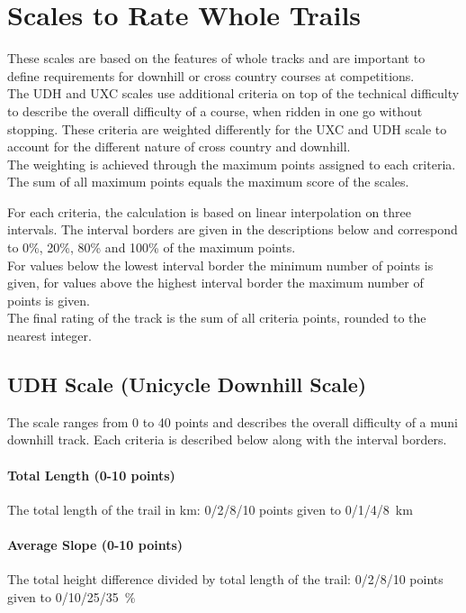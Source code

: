 \documentclass[a4paper,oneside]{scrartcl}
\begin{document}
\section{Scales to Rate Whole Trails}
\label{sec:muni-difficulty-udh-uxc}

These scales are based on the features of whole tracks and are important to
define requirements for downhill or cross country courses at competitions.\\
The UDH and UXC scales use additional criteria on top of the technical difficulty
to describe the overall difficulty of a course, when ridden in one go without stopping.
These criteria are weighted differently for the UXC and UDH scale to account for the
different nature of cross country and downhill.\\
The weighting is achieved through the maximum points assigned to each criteria. The sum
of all maximum points equals the maximum score of the scales.

For each criteria, the calculation is based on linear interpolation on three intervals.
The interval borders are given in the descriptions below and correspond to 0\%,
20\%, 80\% and 100\% of the maximum points.\\
For values below the lowest interval border the minimum number of points is
given, for values above the highest interval border the maximum number of points
is given.\\
The final rating of the track is the sum of all criteria points, rounded to the nearest integer.

\subsection{UDH Scale (Unicycle Downhill Scale)}
\label{sec:udh-scale}

The scale ranges from 0 to 40 points and describes the overall difficulty of a
muni downhill track. Each criteria is described below along with the
interval borders.

\paragraph{Total Length (0-10 points)}
The total length of the trail in km: 0/2/8/10 points given to 0/1/4/8~km

\paragraph{Average Slope (0-10 points)}
The total height difference divided by total length of the trail: 0/2/8/10
points given to 0/10/25/35~\%
\end{document}
